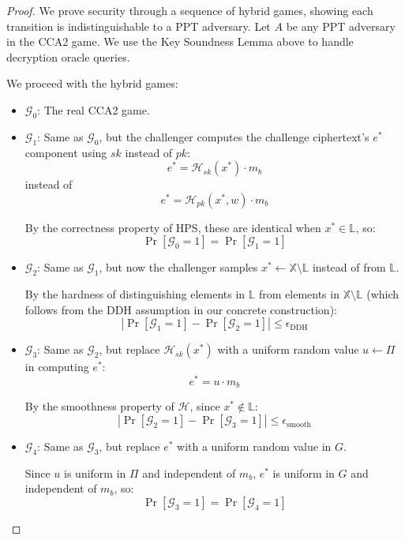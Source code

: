 \begin{proof}
We prove security through a sequence of hybrid games, showing each transition is indistinguishable to a PPT adversary. Let $A$ be any PPT adversary in the CCA2 game. We use the Key Soundness Lemma above to handle decryption oracle queries.

We proceed with the hybrid games:

\begin{itemize}
    \item $\mathcal{G}_0$: The real CCA2 game.
    
    \item $\mathcal{G}_1$: Same as $\mathcal{G}_0$, but the challenger computes the challenge ciphertext's $e^*$ component using $sk$ instead of $pk$:
    \[ e^* = \mathcal{H}_{sk}(x^*) \cdot m_b \]
    instead of
    \[ e^* = \mathcal{H}_{pk}(x^*,w) \cdot m_b \]
    
    By the correctness property of HPS, these are identical when $x^* \in \mathbb{L}$, so:
    \[ \Pr[\mathcal{G}_0 = 1] = \Pr[\mathcal{G}_1 = 1] \]

    \item $\mathcal{G}_2$: Same as $\mathcal{G}_1$, but now the challenger samples $x^* \gets \mathbb{X} \setminus \mathbb{L}$ instead of from $\mathbb{L}$.
    
    By the hardness of distinguishing elements in $\mathbb{L}$ from elements in $\mathbb{X} \setminus \mathbb{L}$ (which follows from the DDH assumption in our concrete construction):
    \[ |\Pr[\mathcal{G}_1 = 1] - \Pr[\mathcal{G}_2 = 1]| \leq \epsilon_{\text{DDH}} \]

    \item $\mathcal{G}_3$: Same as $\mathcal{G}_2$, but replace $\mathcal{H}_{sk}(x^*)$ with a uniform random value $u \gets \Pi$ in computing $e^*$:
    \[ e^* = u \cdot m_b \]
    
    By the smoothness property of $\mathcal{H}$, since $x^* \notin \mathbb{L}$:
    \[ |\Pr[\mathcal{G}_2 = 1] - \Pr[\mathcal{G}_3 = 1]| \leq \epsilon_{\text{smooth}} \]

    \item $\mathcal{G}_4$: Same as $\mathcal{G}_3$, but replace $e^*$ with a uniform random value in $G$. 
    
    Since $u$ is uniform in $\Pi$ and independent of $m_b$, $e^*$ is uniform in $G$ and independent of $m_b$, so:
    \[ \Pr[\mathcal{G}_3 = 1] = \Pr[\mathcal{G}_4 = 1] \]
\end{itemize}


\end{proof}
